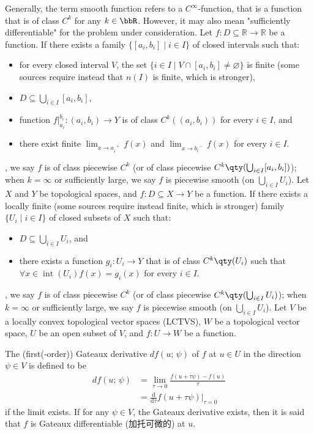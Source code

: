 \documentclass[a4paper,12pt]{report}
\begin{document}
\begin{itemize}
\begin{itemize}
Generally, the term smooth function refers to a $C^{\infty}$-function, that is a function that is of class $C^k$ for any $k\in\bbR$. However, it may also mean "sufficiently differentiable" for the problem under consideration.
Let $f\colon D\subseteq\mathbb{R}\to\mathbb{R}$ be a function. If there exists a family $\{[a_i,b_i]\mid i\in I\}$ of closed intervals such that:
\begin{itemize}
\item for every closed interval $V$, the set $\{i\in I\mid V\cap [a_i,b_i]\neq\varnothing\}$ is finite (some sources require instead that $n(I)$ is finite, which is stronger),
\item $D\subseteq\bigcup_{i\in I}[a_i,b_i]$,
\item function $f\big\vert_{a_i}^{b_i}\colon(a_i,b_i)\to Y$ is of class $C^k((a_i,b_i))$ for every $i\in I$, and
\item there exist finite $\lim_{x\to a_i^{\phantom{i}+}}f(x)$ and $\lim_{x\to b_i^{\phantom{i}-}}f(x)$ for every $i\in I$.
\end{itemize},
we say $f$ is of class piecewise $C^k$ (or of class piecewise $C^k\qty(\bigcup_{i\in I}[a_i,b_i])$); when $k=\infty$ or sufficiently large, we say $f$ is piecewise smooth (on $\bigcup_{i\in I}U_i$).
Let $X$ and $Y$ be topological spaces, and $f\colon D\subseteq X\to Y$ be a function. If there exists a locally finite (some sources require instead finite, which is stronger) family $\{U_i\mid i\in I\}$ of closed subsets of $X$ such that:
\begin{itemize}
\item $D\subseteq\bigcup_{i\in I}U_i$, and
\item there exists a function $g_i\colon U_i\to Y$ that is of class $C^k\qty(U_i)$ such that $\forall x\in\operatorname{int}\left(U_i\right)f(x)=g_i(x)$ for every $i\in I$.
\end{itemize},
we say $f$ is of class piecewise $C^k$ (or of class piecewise $C^k\qty(\bigcup_{i\in I}U_i)$); when $k=\infty$ or sufficiently large, we say $f$ is piecewise smooth (on $\bigcup_{i\in I}U_i$).
Let $V$ be a locally convex topological vector spaces (LCTVS), $W$ be a topological vector space, $U$ be an open subset of $V$, and $f\colon U\to W$ be a function.

The (first(-order)) Gateaux derivative $df(u;\,\psi)$ of $f$ at $u\in U$ in the direction $\psi \in V$ is defined to be
\[\begin{aligned}
df(u;\,\psi) &= \lim_{\tau\to 0}\frac{f(u+\tau \psi)-f(u)}{\tau}\\
&= \frac{\mathrm{d}}{\mathrm{d}\tau}f(u+\tau \psi)\big\vert_{\tau =0}
\end{aligned}\]
if the limit exists. If for any $\psi \in V$, the Gateaux derivative exists, then it is said that $f$ is Gateaux differentiable (加托可微的) at $u$.


\end{itemize}
\end{itemize}
\end{document}
